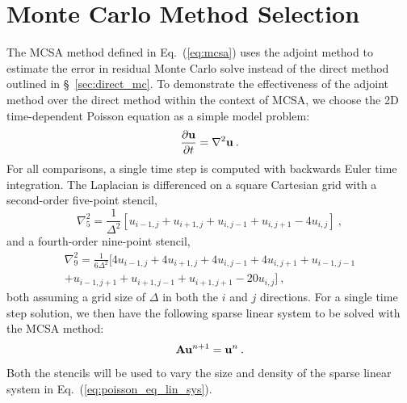 \section{Monte Carlo Method Selection}
The MCSA method defined in Eq.~(\ref{eq:mcsa}) uses the adjoint method
to estimate the error in residual Monte Carlo solve instead of the
direct method outlined in \S~\ref{sec:direct_mc}. To demonstrate
the effectiveness of the adjoint method over the direct method within
the context of MCSA, we choose the 2D time-dependent Poisson equation
as a simple model problem:
\begin{equation}
  \frac{\partial \mathbf{u}}{\partial t} = \nabla^2 \mathbf{u}\:.
  \label{eq:poisson_equation}
\end{equation}
For all comparisons, a single time step is computed with backwards Euler time
integration. The Laplacian is differenced on a square Cartesian grid with a
second-order five-point stencil,
\begin{equation}
  \nabla^2_5 = \frac{1}{\Delta^2}[u_{i-1,j} + u_{i+1,j} + u_{i,j-1} +
    u_{i,j+1} - 4 u_{i,j}]\:,
  \label{eq:five_point_stencil}
\end{equation}
and a fourth-order nine-point stencil,
\begin{multline}
  \nabla^2_9 = \frac{1}{6\Delta^2}[4 u_{i-1,j} + 4 u_{i+1,j} + 4
    u_{i,j-1} + 4 u_{i,j+1} + u_{i-1,j-1}\\ + u_{i-1,j+1} +
    u_{i+1,j-1} + u_{i+1,j+1} - 20 u_{i,j}]\:,
  \label{eq:nine_point_stencil}
\end{multline}
both assuming a grid size of $\Delta$ in both the $i$ and $j$ directions. For
a single time step solution, we then have the following sparse linear system
to be solved with the MCSA method:
\begin{equation}
  \mathbf{A} \mathbf{u}^{n+1} = \mathbf{u}^n\:.
  \label{eq:poisson_eq_lin_sys}
\end{equation}
Both the stencils will be used to vary the size and density of the sparse
linear system in Eq.~(\ref{eq:poisson_eq_lin_sys}).

